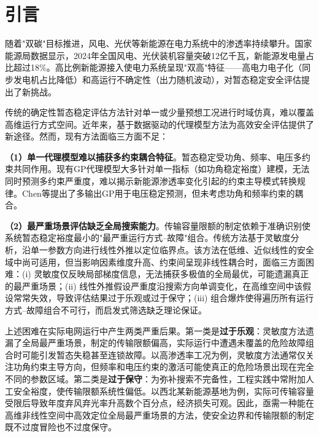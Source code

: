 \section{引言}
\label{sec:intro}

随着"双碳"目标推进，风电、光伏等新能源在电力系统中的渗透率持续攀升。国家能源局数据显示，2024年全国风电、光伏装机容量突破12亿千瓦，新能源发电量占比超过18\%。高比例新能源接入使电力系统呈现"双高"特征——高电力电子化（同步发电机占比降低）和高运行不确定性（出力随机波动），对暂态稳定安全评估提出了新挑战\cite{vittal2022re_stability}。

传统的确定性暂态稳定评估方法针对单一或少量预想工况进行时域仿真，难以覆盖高维运行方式空间。近年来，基于数据驱动的代理模型方法为高效安全评估提供了新途径。然而，现有方法面临三方面不足：

\textbf{（1）单一代理模型难以捕获多约束耦合特征}。暂态稳定受功角、频率、电压多约束共同作用\cite{hatziargyriou2020severity}。现有GP代理模型大多针对单一指标（如功角稳定裕度）建模\cite{ye2024parallel_gp}，无法同时预测多约束严重度，难以揭示新能源渗透率变化引起的约束主导模式转换规律\cite{murray2021voltage_control}。Chen等\cite{liu2020scalable_gp}提出了多输出GP用于电压稳定预测，但未考虑功角和频率约束的耦合。

\textbf{（2）最严重场景评估缺乏全局搜索能力}。传输容量限额的制定依赖于准确识别使系统暂态稳定裕度最小的"最严重运行方式--故障"组合。传统方法基于灵敏度分析\cite{hamilton2023shap_tsa}，沿单一参数方向进行线性外推以定位临界点。该方法在低维、近似线性的安全域中尚可适用，但当影响因素维度升高、约束间呈现非线性耦合时，面临三方面困难：(i) 灵敏度仅反映局部梯度信息，无法捕获多极值的全局最优，可能遗漏真正的最严重场景；(ii) 线性外推假设严重度沿搜索方向单调变化，在高维空间中该假设常常失效，导致评估结果过于乐观或过于保守；(iii) 组合爆炸使得遍历所有运行方式--故障组合不可行，而启发式筛选缺乏理论保证。

上述困难在实际电网运行中产生两类严重后果。第一类是\textbf{过于乐观}：灵敏度方法遗漏了全局最严重场景，制定的传输限额偏高，实际运行中遭遇未覆盖的危险故障组合时可能引发暂态失稳甚至连锁故障。以高渗透率工况为例，灵敏度方法通常仅关注功角约束主导方向，但频率和电压约束的激活可能使真正的危险场景出现在完全不同的参数区域。第二类是\textbf{过于保守}：为弥补搜索不完备性，工程实践中常附加人工安全裕度，使传输限额系统性偏低。以西北某新能源基地为例，实际可传输容量受限后导致年度弃风弃光率升高数个百分点，经济损失可观。因此，亟需一种能在高维非线性空间中高效定位全局最严重场景的方法，使安全边界和传输限额的制定既不过度冒险也不过度保守。

